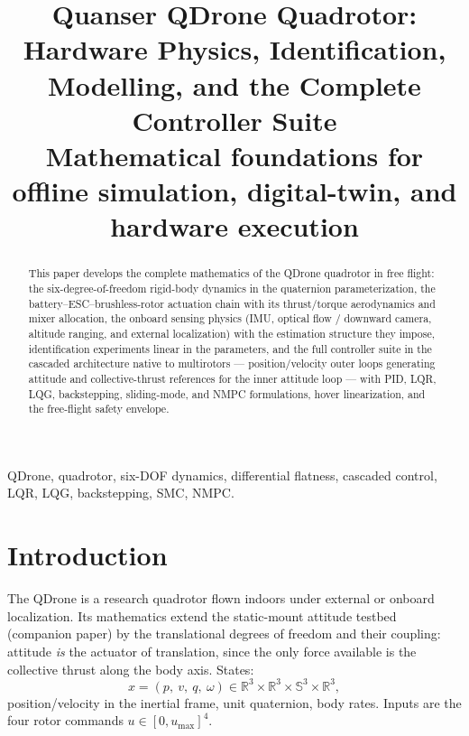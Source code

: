 \documentclass[conference]{IEEEtran}
\begin{document}
\title{Quanser QDrone Quadrotor:\\ Hardware Physics, Identification, Modelling, and the Complete Controller Suite\\
{\footnotesize Mathematical foundations for offline simulation, digital-twin, and hardware execution}}

\author{
}

\maketitle

\begin{abstract}
This paper develops the complete mathematics of the QDrone quadrotor in free flight: the six-degree-of-freedom rigid-body dynamics in the quaternion parameterization, the battery--ESC--brushless-rotor actuation chain with its thrust/torque aerodynamics and mixer allocation, the onboard sensing physics (IMU, optical flow / downward camera, altitude ranging, and external localization) with the estimation structure they impose, identification experiments linear in the parameters, and the full controller suite in the cascaded architecture native to multirotors --- position/velocity outer loops generating attitude and collective-thrust references for the inner attitude loop --- with PID, LQR, LQG, backstepping, sliding-mode, and NMPC formulations, hover linearization, and the free-flight safety envelope.
\end{abstract}

\begin{IEEEkeywords}
QDrone, quadrotor, six-DOF dynamics, differential flatness, cascaded control, LQR, LQG, backstepping, SMC, NMPC.
\end{IEEEkeywords}

\section{Introduction}
The QDrone is a research quadrotor flown indoors under external or onboard localization. Its mathematics extend the static-mount attitude testbed (companion paper) by the translational degrees of freedom and their coupling: attitude \emph{is} the actuator of translation, since the only force available is the collective thrust along the body axis. States:
\begin{equation}
x = (p,\ v,\ q,\ \omega)\in\mathbb R^3\times\mathbb R^3\times\mathbb S^3\times\mathbb R^3,
\end{equation}
position/velocity in the inertial frame, unit quaternion, body rates. Inputs are the four rotor commands $u\in[0,u_{\max}]^4$.
\end{document}
